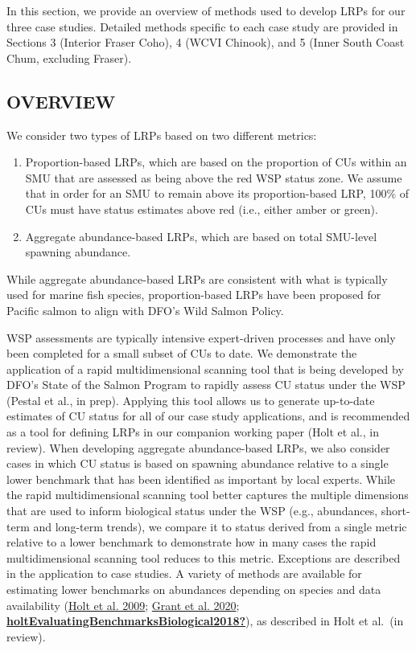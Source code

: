 \documentclass[11pt]{book}
\begin{document}
In this section, we provide an overview of methods used to develop LRPs for our three case studies. Detailed methods specific to each case study are provided in Sections 3 (Interior Fraser Coho), 4 (WCVI Chinook), and 5 (Inner South Coast Chum, excluding Fraser).

\hypertarget{overview}{%
\subsection{OVERVIEW}\label{overview}}

We consider two types of LRPs based on two different metrics:
\begin{enumerate}
\def\labelenumi{\arabic{enumi})}
\item
  Proportion-based LRPs, which are based on the proportion of CUs within an SMU that are assessed as being above the red WSP status zone. We assume that in order for an SMU to remain above its proportion-based LRP, 100\% of CUs must have status estimates above red (i.e., either amber or green).
\item
  Aggregate abundance-based LRPs, which are based on total SMU-level spawning abundance.
\end{enumerate}
While aggregate abundance-based LRPs are consistent with what is typically used for marine fish species, proportion-based LRPs have been proposed for Pacific salmon to align with DFO's Wild Salmon Policy.

WSP assessments are typically intensive expert-driven processes and have only been completed for a small subset of CUs to date. We demonstrate the application of a rapid multidimensional scanning tool that is being developed by DFO's State of the Salmon Program to rapidly assess CU status under the WSP (Pestal et al., in prep). Applying this tool allows us to generate up-to-date estimates of CU status for all of our case study applications, and is recommended as a tool for defining LRPs in our companion working paper (Holt et al., in review). When developing aggregate abundance-based LRPs, we also consider cases in which CU status is based on spawning abundance relative to a single lower benchmark that has been identified as important by local experts. While the rapid multidimensional scanning tool better captures the multiple dimensions that are used to inform biological status under the WSP (e.g., abundances, short-term and long-term trends), we compare it to status derived from a single metric relative to a lower benchmark to demonstrate how in many cases the rapid multidimensional scanning tool reduces to this metric. Exceptions are described in the application to case studies. A variety of methods are available for estimating lower benchmarks on abundances depending on species and data availability (\protect\hyperlink{ref-holtIndicatorsStatusBenchmarks2009}{Holt et al. 2009}; \protect\hyperlink{ref-grant2017FraserSockeye2020}{Grant et al. 2020}; \protect\hyperlink{ref-holtEvaluatingBenchmarksBiological2018}{\textbf{holtEvaluatingBenchmarksBiological2018?}}), as described in Holt et al.~(in review).
\end{document}
